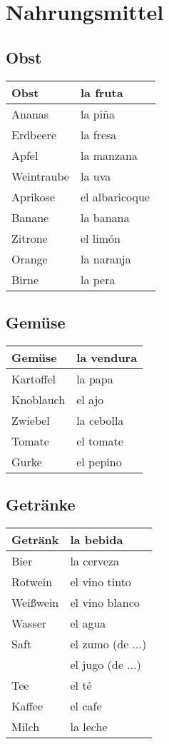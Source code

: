 \documentclass[10pt,spanish]{report}
\begin{document}
\chapter*{Nahrungsmittel}

\section*{Obst}
\begin{longtable}{p{} | p{}} 
\textbf{Obst}     & \textbf{la fruta}                                  \\ \hline
\hline
\endhead %
Ananas & la pi\~{n}a \\
Erdbeere & la fresa \\
Apfel & la manzana \\
Weintraube & la uva \\
Aprikose & el albaricoque \\
Banane & la banana \\
Zitrone & el limón\\
Orange & la naranja \\
Birne & la pera \\
\end{longtable}


\section*{Gemüse}
\begin{longtable}{p{} | p{}} 
\textbf{Gemüse}     & \textbf{la vendura}                                       \\ \hline
\hline
\endhead %
Kartoffel & la papa\\
Knoblauch & el ajo\\
Zwiebel & la cebolla\\
Tomate & el tomate\\
Gurke & el pepino\\
\end{longtable}


\section*{Getränke}
\begin{longtable}{p{} | p{}} 
\textbf{Getränk}     & \textbf{la bebida}                                       \\ \hline
\hline
\endhead %
  Bier & la cerveza\\
  Rotwein & el vino tinto\\
  Weißwein & el vino blanco\\
  Wasser & el agua \\
  Saft & el zumo (de ...)\\
  & el jugo (de ...) \\
  Tee & el té \\
  Kaffee & el cafe \\
  Milch & la leche \\
\end{longtable}
\end{document}
